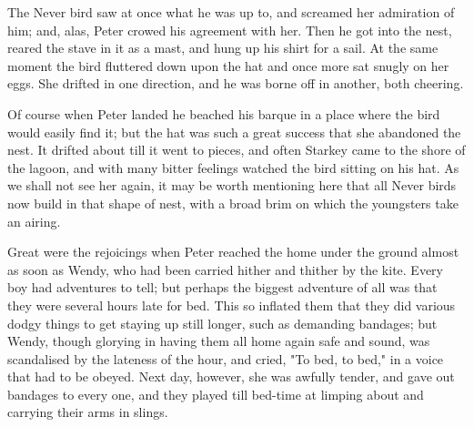 The Never bird saw at once what he was up to, and screamed her admiration
of him; and, alas, Peter crowed his agreement with her. Then he got into
the nest, reared the stave in it as a mast, and hung up his shirt for a
sail. At the same moment the bird fluttered down upon the hat and once
more sat snugly on her eggs. She drifted in one direction, and he was
borne off in another, both cheering.


Of course when Peter landed he beached his barque in a place where
the bird would easily find it; but the hat was such a great success that
she abandoned the nest. It drifted about till it went to pieces, and often
Starkey came to the shore of the lagoon, and with many bitter feelings
watched the bird sitting on his hat. As we shall not see her again, it may
be worth mentioning here that all Never birds now build in that shape of
nest, with a broad brim on which the youngsters take an airing.


Great were the rejoicings when Peter reached the home under the ground
almost as soon as Wendy, who had been carried hither and thither by the
kite. Every boy had adventures to tell; but perhaps the biggest adventure
of all was that they were several hours late for bed. This so inflated
them that they did various dodgy things to get staying up still longer,
such as demanding bandages; but Wendy, though glorying in having them all
home again safe and sound, was scandalised by the lateness of the hour,
and cried, "To bed, to bed," in a voice that had to be obeyed. Next day,
however, she was awfully tender, and gave out bandages to every one, and
they played till bed-time at limping about and carrying their arms in
slings.

